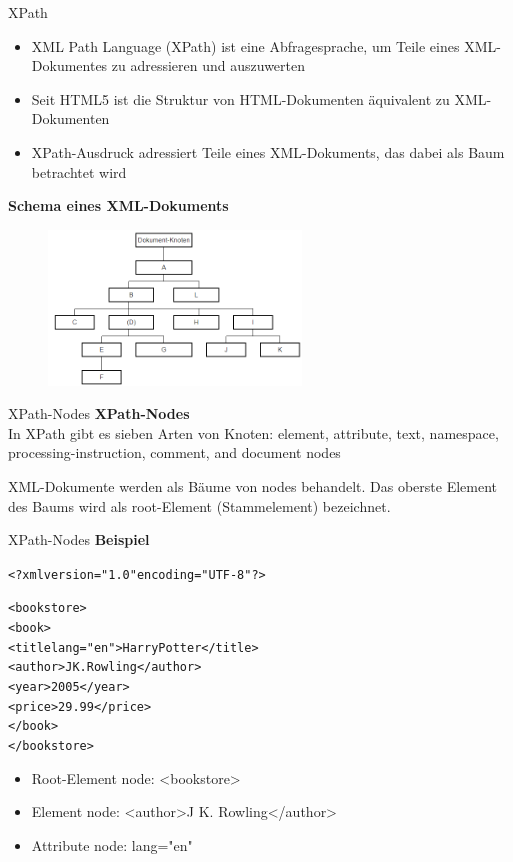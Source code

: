 \documentclass[xcolor=dvipsnames]{beamer}\usepackage[]{graphicx}\usepackage[]{color}
\makeatletter
\newcommand{\hlstr}[1]{\textcolor[rgb]{0.192,0.494,0.8}{#1}}%
\newenvironment{kframe}{%
 \def\at@end@of@kframe{}%
 \ifinner\ifhmode%
  \def\at@end@of@kframe{\end{minipage}}%
  \begin{minipage}{\columnwidth}%
 \fi\fi%
 \def\FrameCommand##1{\hskip\@totalleftmargin \hskip-\fboxsep
 \colorbox{shadecolor}{##1}\hskip-\fboxsep
     \hskip-\linewidth \hskip-\@totalleftmargin \hskip\columnwidth}%
 \MakeFramed {\advance\hsize-\width
   \@totalleftmargin\z@ \linewidth\hsize
   \@setminipage}}%
 {\par\unskip\endMakeFramed%
 \at@end@of@kframe}
\makeatother
\begin{document}
\begin{frame}{XPath}
\begin{itemize}
\item XML Path Language (XPath) ist eine Abfragesprache, um Teile eines XML-Dokumentes zu adressieren und auszuwerten
\item Seit HTML5 ist die Struktur von HTML-Dokumenten äquivalent zu XML-Dokumenten
\item XPath-Ausdruck adressiert Teile eines XML-Dokuments, das dabei als Baum betrachtet wird
\end{itemize}
\textbf{Schema eines XML-Dokuments}
  \begin{figure}
	\centering
	\includegraphics[width=0.6\textwidth]{figure/XML-Structure.png}
  \end{figure}
\end{frame}


\begin{frame}{XPath-Nodes}
\textbf{XPath-Nodes}\\
In XPath gibt es sieben Arten von Knoten: element, attribute, text, namespace, processing-instruction, comment, and document nodes

XML-Dokumente werden als Bäume von nodes behandelt. Das oberste Element des Baums wird als root-Element (Stammelement) bezeichnet.
\end{frame}


\begin{frame}[fragile]{XPath-Nodes}
\textbf{Beispiel}
\begin{kframe}
\begin{alltt}
<?xml version=\hlstr{"1.0"} encoding=\hlstr{"UTF-8"}?>

<bookstore>
  <book>
    <title lang=\hlstr{"en"}>Harry Potter</title>
    <author>J K. Rowling</author>
    <year>2005</year>
    <price>29.99</price>
  </book>
</bookstore>
\end{alltt}
\end{kframe}
  \begin{itemize}
    \item Root-Element node: <bookstore>
    \item Element node: <author>J K. Rowling</author>
    \item Attribute node: lang="en" 
  \end{itemize}
\end{frame}
\end{document}
